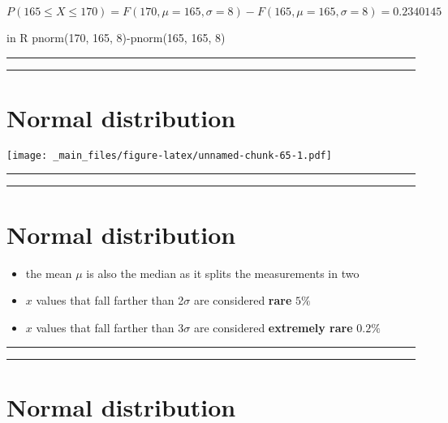 \documentclass[
]{book}
\providecommand{\tightlist}{%
  \setlength{\itemsep}{0pt}\setlength{\parskip}{0pt}}
\begin{document}
\(P(165 \le X \le 170)=F(170, \mu=165, \sigma=8)-F(165, \mu=165, \sigma=8)=0.2340145\)

in R pnorm(170, 165, 8)-pnorm(165, 165, 8)

\begin{center}\rule{0.5\linewidth}{0.5pt}\end{center}

\begin{center}\rule{0.5\linewidth}{0.5pt}\end{center}

\hypertarget{normal-distribution-3}{%
\section{Normal distribution}\label{normal-distribution-3}}

\texttt{[image: \_main\_files/figure-latex/unnamed-chunk-65-1.pdf]}

\begin{center}\rule{0.5\linewidth}{0.5pt}\end{center}

\begin{center}\rule{0.5\linewidth}{0.5pt}\end{center}

\hypertarget{normal-distribution-4}{%
\section{Normal distribution}\label{normal-distribution-4}}

\begin{itemize}
\tightlist
\item
  the mean \(\mu\) is also the median as it splits the measurements in two
\item
  \(x\) values that fall farther than 2\(\sigma\) are considered \textbf{rare} \(5\%\)
\item
  \(x\) values that fall farther than 3\(\sigma\) are considered \textbf{extremely rare} \(0.2\%\)
\end{itemize}

\begin{center}\rule{0.5\linewidth}{0.5pt}\end{center}

\begin{center}\rule{0.5\linewidth}{0.5pt}\end{center}

\hypertarget{normal-distribution-5}{%
\section{Normal distribution}\label{normal-distribution-5}}
\end{document}
